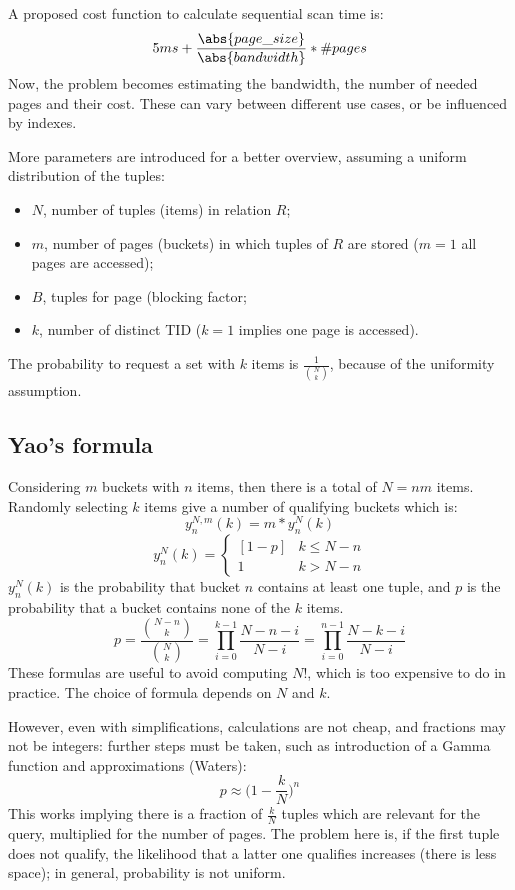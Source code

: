 A proposed cost function to calculate sequential scan time is: 
$$5ms + \frac{\abs{page\_size}}{\abs{bandwidth}} * \#pages$$
Now, the problem becomes estimating the bandwidth, the number of needed pages and their cost. These can vary between different use cases, or be influenced by indexes. 

More parameters are introduced for a better overview, assuming a uniform distribution of the tuples:
\begin{itemize}
	\item $N$, number of tuples (items) in relation $R$;
	\item $m$, number of pages (buckets) in which tuples of $R$ are stored ($m = 1$ all pages are accessed);
	\item $B$, tuples for page (blocking factor;
	\item $k$, number of distinct TID ($k = 1$ implies one page is accessed).
\end{itemize}
The probability to request a set with $k$ items is $\frac{1}{{{N}\choose{k}}}$, because of the uniformity assumption.

\subsection{Yao's formula}
Considering $m$ buckets with $n$ items, then there is a total of $N = nm$ items. Randomly selecting $k$ items give a number of qualifying buckets which is:
$$y^{N, m}_n(k) = m * y^N_n(k)$$
$$y^N_n(k) = \begin{cases}
	[1 - p] & k \leq N - n \\
	1 & k > N - n
\end{cases}$$
$y^N_n(k)$ is the probability that bucket $n$ contains at least one tuple, and $p$ is the probability that a bucket contains none of the $k$ items.
$$p = \frac{{{N-n}\choose{k}}}{{{N}\choose{k}}} = \prod_{i=0}^{k-1} \frac{N-n-i}{N-i} = \prod_{i=0}^{n-1}\frac{N-k-i}{N-i}$$
These formulas are useful to avoid computing $N!$, which is too expensive to do in practice. The choice of formula depends on $N$ and $k$.

However, even with simplifications, calculations are not cheap, and fractions may not be integers: further steps must be taken, such as introduction of a Gamma function and approximations (Waters):
$$ p \approx \Big( 1 - \frac{k}{N} \Big)^n$$
This works implying there is a fraction of $\frac{k}{N}$ tuples which are relevant for the query, multiplied for the number of pages. The problem here is, if the first tuple does not qualify, the likelihood that a latter one qualifies increases (there is less space); in general, probability is not uniform.

